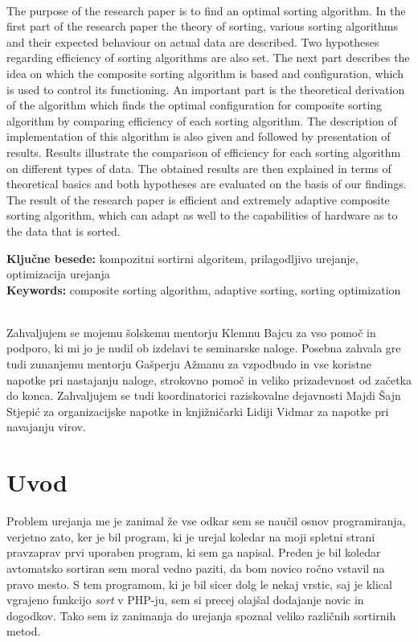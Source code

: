\documentclass[a4paper,oneside,12pt]{article}
\begin{document}
\\[5mm]
The purpose of the research paper is to find an optimal sorting algorithm. In
the first part of the research paper the theory of sorting, various sorting
algorithms and their expected behaviour on actual data are described. Two
hypotheses regarding efficiency of sorting algorithms are also set.
The next part describes the idea on which the composite sorting algorithm is based and
configuration, which is used to control its functioning. An important part is the
theoretical derivation of the algorithm which finds the optimal configuration
for composite sorting algorithm by comparing efficiency of each sorting
algorithm. The description of implementation of this algorithm is also given and
followed by presentation of results. Results illustrate the comparison of
efficiency for each sorting algorithm on different types of data. The obtained
results are then explained in terms of theoretical basics and both hypotheses are evaluated on the basis
of our findings. The result of the research paper is efficient and extremely
adaptive composite sorting algorithm, which can adapt as well to the capabilities
of hardware as to the data that is sorted.

\vfill
\noindent \textbf{Ključne besede:} kompozitni sortirni algoritem, prilagodljivo urejanje, optimizacija urejanja \\[2mm]
\textbf{Keywords:} composite sorting algorithm, adaptive sorting, sorting optimization

\pagebreak

\\[5mm]
Zahvaljujem se mojemu šolskemu mentorju Klemnu Bajcu za vso pomoč in podporo,
ki mi jo je nudil ob izdelavi te seminarske naloge.  Posebna zahvala gre tudi zunanjemu
mentorju Gašperju Ažmanu za vzpodbudo in vse koristne napotke pri nastajanju
naloge, strokovno pomoč in veliko prizadevnost od začetka do konca. Zahvaljujem
se tudi koordinatorici raziskovalne dejavnosti Majdi Šajn
Stjepić za organizacijske napotke in knjižničarki Lidiji Vidmar za napotke pri
navajanju virov.
\pagebreak

\thispagestyle{empty}
\tableofcontents
\pagebreak
\thispagestyle{empty}
\listoffigures
\pagebreak
\thispagestyle{empty}
\listoftables
\pagebreak
\thispagestyle{empty}
\listofalgorithms
\pagebreak

\section{Uvod}
\label{chapter:uvod}
Problem urejanja me je zanimal že vse odkar sem se naučil osnov programiranja,
verjetno zato, ker je bil program, ki je urejal koledar na moji spletni strani
pravzaprav prvi uporaben program, ki sem ga napisal. Preden je bil koledar 
avtomatsko sortiran sem moral vedno paziti, da bom novico ročno vstavil na pravo
mesto. S tem programom, ki je bil sicer dolg le nekaj vrstic, saj je klical
vgrajeno funkcijo \emph{sort} v PHP-ju, sem si precej olajšal dodajanje novic in dogodkov.  
Tako sem iz zanimanja do urejanja spoznal veliko različnih sortirnih metod.
\end{document}
